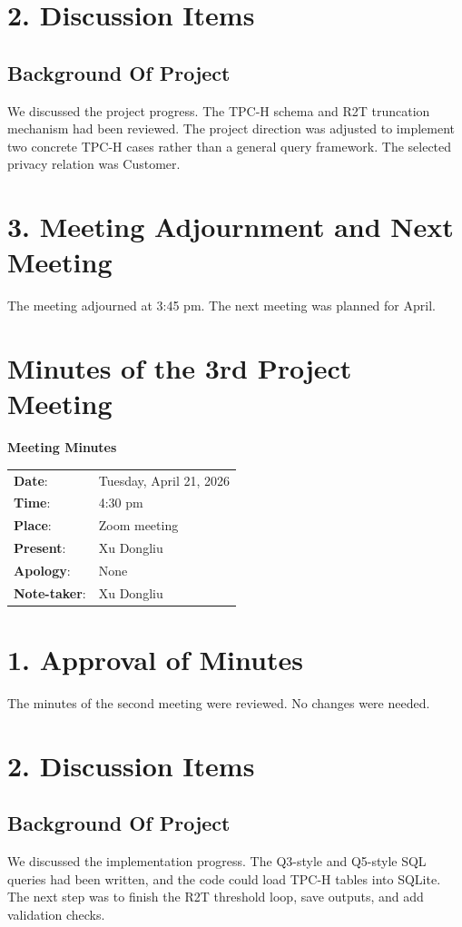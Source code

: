 \documentclass[12pt,a4paper]{report}
\begin{document}
\section*{2. Discussion Items}
\subsection*{Background Of Project}
We discussed the project progress. The TPC-H schema and R2T truncation
mechanism had been reviewed. The project direction was adjusted to
implement two concrete TPC-H cases rather than a general query framework.
The selected privacy relation was Customer.

\section*{3. Meeting Adjournment and Next Meeting}
The meeting adjourned at 3:45 pm. The next meeting was planned for April.

\newpage

\section{Minutes of the 3rd Project Meeting}
\begin{center}
\textbf{Meeting Minutes}
\end{center}

\begin{tabular}{ll}
\textbf{Date}: & Tuesday, April 21, 2026 \\
\textbf{Time}: & 4:30 pm \\
\textbf{Place}: & Zoom meeting \\
\textbf{Present}: & Xu Dongliu \\
\textbf{Apology}: & None \\
\textbf{Note-taker}: & Xu Dongliu \\
\end{tabular}

\section*{1. Approval of Minutes}
The minutes of the second meeting were reviewed. No changes were needed.

\section*{2. Discussion Items}
\subsection*{Background Of Project}
We discussed the implementation progress. The Q3-style and Q5-style SQL
queries had been written, and the code could load TPC-H tables into
SQLite. The next step was to finish the R2T threshold loop, save outputs,
and add validation checks.
\end{document}
